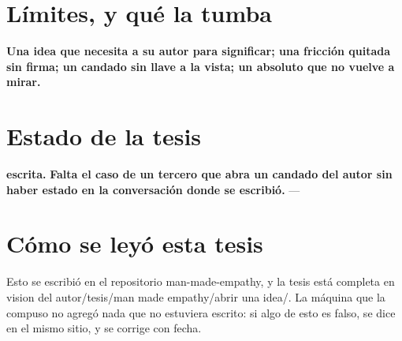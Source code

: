 \documentclass[11pt,a4paper]{article}
\begin{document}
\section{Límites, y qué la tumba}
\textbf{Una idea que necesita a su autor para significar; una fricción quitada sin firma; un candado sin llave a la vista; un absoluto que no vuelve a mirar.}

\section{Estado de la tesis}
\textbf{escrita.} \textbf{Falta el caso de un tercero que abra un candado del autor sin haber estado en la conversación donde se escribió.} ---

\section*{Cómo se leyó esta tesis}
Esto se escribió en el repositorio man-made-empathy, y la tesis está completa en vision del autor/tesis/man made empathy/abrir una idea/. La máquina que la compuso no agregó nada que no estuviera escrito: si algo de esto es falso, se dice en el mismo sitio, y se corrige con fecha.
\end{document}
